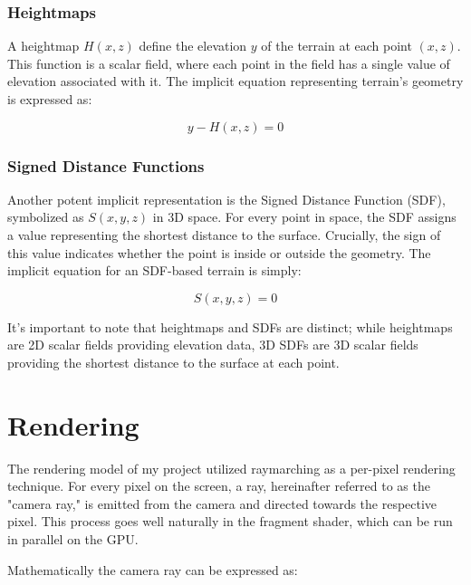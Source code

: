 \subsubsection{Heightmaps}

A heightmap $H(x,z)$ define the elevation $y$ of the terrain at each point $(x,z)$. This function is a scalar field, where each point in the field has a single value of elevation associated with it. The implicit equation representing terrain's geometry is expressed as:

\begin{equation}
y - H(x,z) = 0
\end{equation}


\subsubsection{Signed Distance Functions}

Another potent implicit representation is the Signed Distance Function (SDF), symbolized as $S(x,y,z)$ in 3D space. For every point in space, the SDF assigns a value representing the shortest distance to the surface. Crucially, the sign of this value indicates whether the point is inside or outside the geometry. The implicit equation for an SDF-based terrain is simply:

\begin{equation}
S(x,y,z) = 0 
\end{equation}

It's important to note that heightmaps and SDFs are distinct; while heightmaps are 2D scalar fields providing elevation data, 3D SDFs are 3D scalar fields providing the shortest distance to the surface at each point. 


\section{Rendering}
\label{Rendering}

The rendering model of my project utilized raymarching as a per-pixel rendering technique. For every pixel on the screen, a ray, hereinafter referred to as the "camera ray," is emitted from the camera and directed towards the respective pixel. This process goes well naturally in the fragment shader, which can be run in parallel on the GPU.

Mathematically the camera ray can be expressed as:

